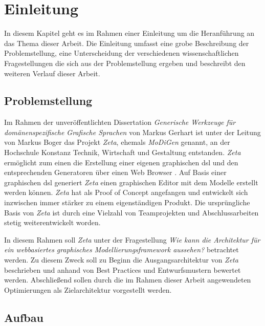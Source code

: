 \chapter{Einleitung}

In diesem Kapitel geht es im Rahmen einer Einleitung um die Heranführung an das Thema dieser Arbeit. Die Einleitung umfasst eine grobe Beschreibung der Problemstellung, eine Unterscheidung der verschiedenen wissenschaftlichen Fragestellungen die sich aus der Problemstellung ergeben und beschreibt den weiteren Verlauf dieser Arbeit. 

\section{Problemstellung}

Im Rahmen der unveröffentlichten Dissertation \textit{Generische Werkzeuge für domänenspezifische Grafische Sprachen} von Markus Gerhart ist unter der Leitung von Markus Boger das Projekt \textit{Zeta}, ehemals \textit{MoDiGen} genannt, an der Hochschule Konstanz Technik, Wirtschaft und Gestaltung entstanden. \textit{Zeta} ermöglicht zum einen die Erstellung einer eigenen graphischen \ac{dsl} und den entsprechenden Generatoren über einen Web Browser \cite{zeta_paper,zeta_masterthesis_actor}. Auf Basis einer graphischen \ac{dsl} generiert \textit{Zeta} einen graphischen Editor mit dem Modelle erstellt werden können. \textit{Zeta} hat als Proof of Concept angefangen und entwickelt sich inzwischen immer stärker zu einem eigenständigen Produkt. Die ursprüngliche Basis von \textit{Zeta} ist durch eine Vielzahl von Teamprojekten und Abschlussarbeiten stetig weiterentwickelt worden.

In diesem Rahmen soll \textit{Zeta} unter der Fragestellung \textit{Wie kann die Architektur für ein webbasiertes graphisches Modellierungsframework aussehen?} betrachtet werden. Zu diesem Zweck soll zu Beginn die Ausgangsarchitektur von \textit{Zeta} beschrieben und anhand von Best Practices und Entwurfsmustern bewertet werden. Abschließend sollen durch die im Rahmen dieser Arbeit angewendeten Optimierungen als Zielarchitektur vorgestellt werden.

\section{Aufbau}

